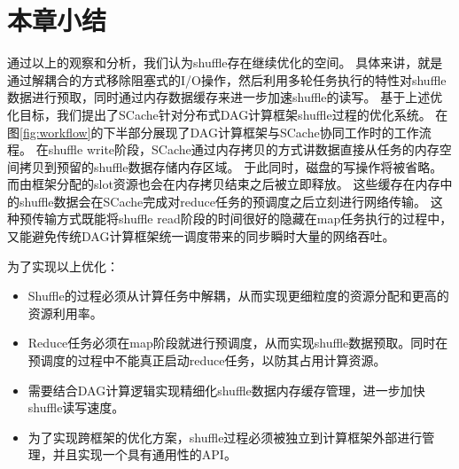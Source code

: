 \section{本章小结}
通过以上的观察和分析，我们认为shuffle存在继续优化的空间。
具体来讲，就是通过解耦合的方式移除阻塞式的I/O操作，然后利用多轮任务执行的特性对shuffle数据进行预取，同时通过内存数据缓存来进一步加速shuffle的读写。
基于上述优化目标，我们提出了SCache针对分布式DAG计算框架shuffle过程的优化系统。
在图\ref{fig:workflow}的下半部分展现了DAG计算框架与SCache协同工作时的工作流程。
在shuffle write阶段，SCache通过内存拷贝的方式讲数据直接从任务的内存空间拷贝到预留的shuffle数据存储内存区域。
于此同时，磁盘的写操作将被省略。而由框架分配的slot资源也会在内存拷贝结束之后被立即释放。
这些缓存在内存中的shuffle数据会在SCache完成对reduce任务的预调度之后立刻进行网络传输。
这种预传输方式既能将shuffle read阶段的时间很好的隐藏在map任务执行的过程中，又能避免传统DAG计算框架统一调度带来的同步瞬时大量的网络吞吐。

为了实现以上优化：
\begin{itemize}
	\item Shuffle的过程必须从计算任务中解耦，从而实现更细粒度的资源分配和更高的资源利用率。
	\item Reduce任务必须在map阶段就进行预调度，从而实现shuffle数据预取。同时在预调度的过程中不能真正启动reduce任务，以防其占用计算资源。
	\item 需要结合DAG计算逻辑实现精细化shuffle数据内存缓存管理，进一步加快shuffle读写速度。
	\item 为了实现跨框架的优化方案，shuffle过程必须被独立到计算框架外部进行管理，并且实现一个具有通用性的API。
\end{itemize}
